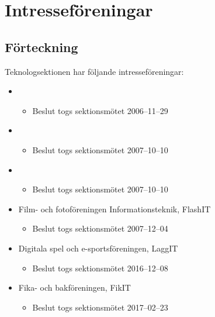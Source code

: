 \section{Intresseföreningar}

\subsection{Förteckning}

Teknologsektionen har följande intresseföreningar:

\begin{itemize}
	\item \EIGHTBITFULL{}
	\begin{itemize}
		\item Beslut togs sektionsmötet 2006--11--29
	\end{itemize}
	\item \DRAWITFULL{}
	\begin{itemize}
		\item Beslut togs sektionsmötet 2007--10--10
	\end{itemize}
	\item \HOOKITFULL{}
	\begin{itemize}
		\item Beslut togs sektionsmötet 2007--10--10
	\end{itemize}
	\item Film- och fotoföreningen Informationsteknik, FlashIT
	\begin{itemize}
		\item Beslut togs sektionsmötet 2007--12--04
	\end{itemize}
	\item Digitala spel och e-sportsföreningen, LaggIT
	\begin{itemize}
		\item Beslut togs sektionsmötet 2016--12--08
	\end{itemize}
    \item Fika- och bakföreningen, FikIT
    \begin{itemize}
        \item Beslut togs sektionsmötet 2017--02--23
    \end{itemize}
\end{itemize}
